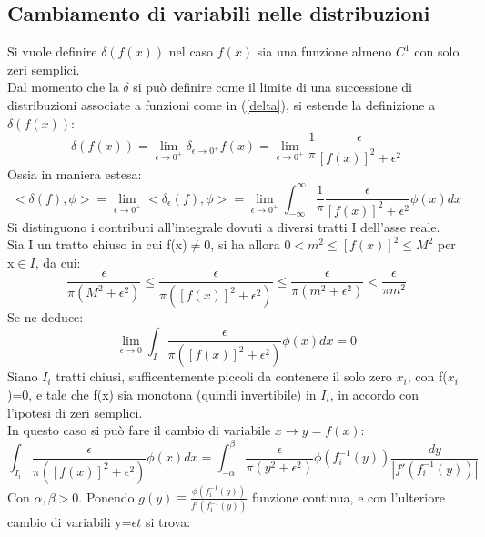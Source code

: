 \documentclass[twoside]{article}
\begin{document}
\subsection{Cambiamento di variabili nelle distribuzioni}

Si vuole definire $\delta(f(x))$ nel caso $f(x)$ sia una funzione almeno $C^1$ con solo zeri semplici.
\\
Dal momento che la $\delta$ si può definire come il limite di una successione di distribuzioni associate a funzioni come in (\ref{delta}), si estende la definizione a $\delta(f(x))$:
\begin{equation}
    \delta(f(x))=\lim_{\epsilon\to 0^+}\delta_{\epsilon\to 0^+}f(x)=\lim_{\epsilon\to 0^+}\frac{1}{\pi}\frac{\epsilon}{[f(x)]^2+\epsilon^2}
\end{equation}
Ossia in maniera estesa:
\begin{equation}
<\delta(f),\phi>=\lim_{\epsilon\to 0^+}<\delta_{\epsilon}(f),\phi>=\lim_{\epsilon\to 0^+} \int_{-\infty}^{\infty}\frac{1}{\pi}\frac{\epsilon}{[f(x)]^2+\epsilon^2}\phi(x) dx
\end{equation}
Si distinguono i contributi all'integrale dovuti a diversi tratti I dell'asse reale.\\
Sia I un tratto chiuso in cui f(x)$\ne$0, si ha allora $0<m^2\le[f(x)]^2\le M^2$ per x$\in I$, da cui:
\begin{equation}
    \frac{\epsilon}{\pi(M^2+\epsilon^2)}\le \frac{\epsilon}{\pi([f(x)]^2+\epsilon^2)}\le \frac{\epsilon}{\pi(m^2+\epsilon^2)}<\frac{\epsilon}{\pi m^2}
\end{equation}
Se ne deduce:
\begin{equation}
    \lim_{\epsilon\to 0}\int_I\frac{\epsilon}{\pi([f(x)]^2+\epsilon^2)}\phi(x) dx=0
\end{equation}
Siano $I_i$ tratti chiusi, sufficentemente piccoli da contenere il solo zero $x_i$, con f($x_i$)=0, e tale che f(x) sia monotona (quindi invertibile) in $I_i$, in accordo con l'ipotesi di zeri semplici.\\
In questo caso si può fare il cambio di variabile $x\to y=f(x)$:
\begin{equation}
\int_{I_i}\frac{\epsilon}{\pi([f(x)]^2+\epsilon^2)} \phi(x)dx=\int_{-\alpha}^\beta \frac{\epsilon}{\pi (y^2+\epsilon^2)}\phi(f_i^{-1}(y))\frac{dy}{|f'(f_i^{-1}(y))|}
\end{equation}
Con $\alpha,\beta>0$. Ponendo $g(y)\equiv \frac{\phi(f_i^{-1}(y))}{f'(f_i^{-1}(y))}$ funzione continua, e con l'ulteriore cambio di variabili y=$\epsilon t$ si trova:
\end{document}
